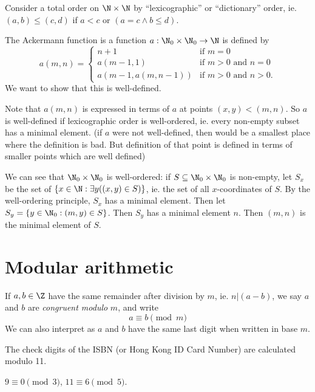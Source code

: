 \documentclass[a4paper]{article}
\begin{document}
  \begin{eg}
    Consider a total order on $\N\times \N$ by ``lexicographic'' or ``dictionary'' order, ie. $(a, b) \leq (c, d)$ if $a < c$ or $(a = c\wedge b\leq d)$.

    The Ackermann function is a function $a:\N_0\times \N_0 \to \N$ is defined by 
    \[
      a(m, n) =\begin{cases}n+1 & \mbox{if } m = 0 \\a(m-1, 1) & \mbox{if } m > 0 \mbox{ and } n = 0 \\a(m-1, a(m, n-1)) & \mbox{if } m > 0 \mbox{ and } n > 0.\end{cases}
    \]
    We want to show that this is well-defined.

    Note that $a(m, n)$ is expressed in terms of $a$ at points $(x, y) < (m, n)$. So $a$ is well-defined if lexicographic order is well-ordered, ie. every non-empty subset has a minimal element. (if $a$ were not well-defined, then would be a smallest place where the definition is bad. But definition of that point is defined in terms of smaller points which are well defined)

    We can see that $\N_0\times \N_0$ is well-ordered: if $S\subseteq \N_0\times \N_0$ is non-empty, let $S_x$ be the set of $\{x\in \N: \exists y((x, y)\in S)\}$, ie. the set of all $x$-coordinates of $S$. By the well-ordering principle, $S_x$ has a minimal element. Then let $S_y = \{y\in \N_0: (m, y)\in S\}$. Then $S_y$ has a minimal element $n$. Then $(m, n)$ is the minimal element of $S$.
  \end{eg}

  \section{Modular arithmetic}
  \begin{defi}[Modulo]
    If $a, b\in \Z$ have the same remainder after division by $m$, ie. $n | (a - b)$, we say $a$ and $b$ are \emph{congruent modulo} $m$, and write
    \[
      a\equiv b\pmod m
    \]
    We can also interpret as $a$ and $b$ have the same last digit when written in base $m$.
  \end{defi}

  \begin{eg}
    The check digits of the ISBN (or Hong Kong ID Card Number) are calculated modulo 11.
  \end{eg}

  \begin{eg}
    $9 \equiv 0\pmod 3$, $11\equiv 6\pmod 5$.
  \end{eg}
\end{document}
